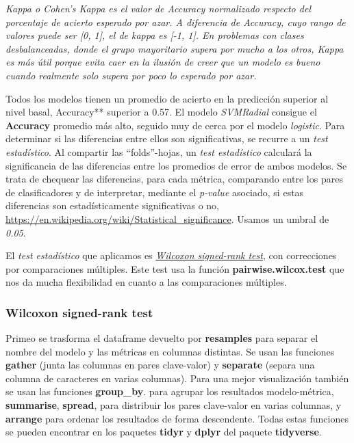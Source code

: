 \documentclass[]{article}
\begin{document}
\emph{Kappa o Cohen's Kappa es el valor de Accuracy normalizado respecto
del porcentaje de acierto esperado por azar. A diferencia de Accuracy,
cuyo rango de valores puede ser {[}0, 1{]}, el de kappa es {[}-1, 1{]}.
En problemas con clases desbalanceadas, donde el grupo mayoritario
supera por mucho a los otros, Kappa es más útil porque evita caer en la
ilusión de creer que un modelo es bueno cuando realmente solo supera por
poco lo esperado por azar. }

Todos los modelos tienen un promedio de acierto en la predicción
superior al nivel basal, Accuracy** superior a 0.57. El modelo
\emph{SVMRadial} consigue el \textbf{Accuracy} promedio más alto,
seguido muy de cerca por el modelo \emph{logistic}. Para determinar si
las diferencias entre ellos son significativas, se recurre a un
\emph{test estadístico}. Al compartir las ``folds''-hojas, un \emph{test
estadístico} calculará la significancia de las diferencias entre los
promedios de error de ambos modelos. Se trata de chequear las
diferencias, para cada métrica, comparando entre los pares de
clasificadores y de interpretar, mediante el \emph{p-value} asociado, si
estas diferencias son estadísticamente significativas o no,
\url{https://en.wikipedia.org/wiki/Statistical_significance}. Usamos un
umbral de \emph{0.05}.

El \emph{test estadístico} que aplicamos es
\href{https://www.cienciadedatos.net/documentos/18_prueba_de_los_rangos_con_signo_de_wilcoxon}{\emph{Wilcoxon
signed-rank test}}, con correcciones por comparaciones múltiples. Este
test usa la función \textbf{pairwise.wilcox.test} que nos da mucha
flexibilidad en cuanto a las comparaciones múltiples.

\hypertarget{wilcoxon-signed-rank-test}{%
\subsubsection{Wilcoxon signed-rank
test}\label{wilcoxon-signed-rank-test}}

Primeo se trasforma el dataframe devuelto por \textbf{resamples} para
separar el nombre del modelo y las métricas en columnas distintas. Se
usan las funciones \textbf{gather} (junta las columnas en pares
clave-valor) y \textbf{separate} (separa una columna de caracteres en
varias columnas). Para una mejor visualización también se usan las
funciones \textbf{group\_by}. para agrupar los resultados
modelo-métrica, \textbf{summarise}, \textbf{spread}, para distribuir los
pares clave-valor en varias columnas, y \textbf{arrange} para ordenar
los resultados de forma descendente. Todas estas funciones se pueden
encontrar en los paquetes \textbf{tidyr} y \textbf{dplyr} del paquete
\textbf{tidyverse}.
\end{document}
